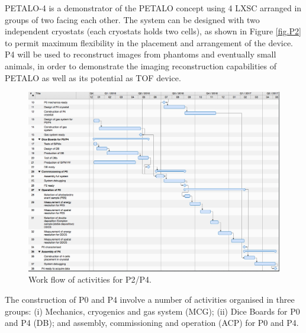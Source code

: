 PETALO-4 is a demonstrator of the PETALO concept using 4 LXSC arranged in groups of two facing each other. The system can be designed with two independent cryostats (each cryostats holds two cells), as shown in Figure \ref{fig.P2} to permit maximum flexibility in the placement and arrangement of the device. P4 will be used to reconstruct images from phantoms and eventually small animals, in order to demonstrate the imaging reconstruction capabilities of PETALO as well as its potential as TOF device. 


\begin{figure}[!htb]
	\centering
	\includegraphics[scale=0.4]{img/PDETWF.png}
	\caption{\label{fig.P2WF} Work flow of activities for P2/P4.  }
\end{figure}

The construction of P0 and P4 involve a number of activities  organised in three groups: (i) Mechanics, cryogenics and gas system (MCG);  (ii) Dice Boards for P0 and P4 (DB);  and assembly, commissioning and operation (ACP) for P0 and P4. 

